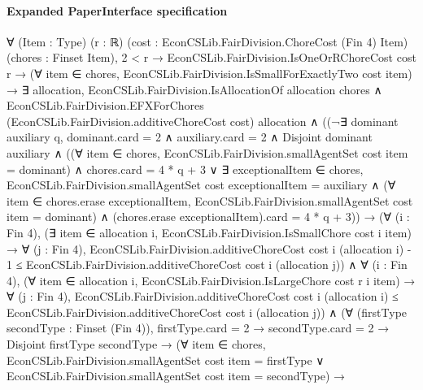 \documentclass[10pt]{article}
\begin{document}
\paragraph{Expanded PaperInterface specification}
\begin{ReviewVerbatim}
∀ (Item : Type) (r : ℝ) (cost : EconCSLib.FairDivision.ChoreCost (Fin 4) Item) (chores : Finset Item),
  2 < r →
    EconCSLib.FairDivision.IsOneOrRChoreCost cost r →
      (∀ item ∈ chores, EconCSLib.FairDivision.IsSmallForExactlyTwo cost item) →
        ∃ allocation,
          EconCSLib.FairDivision.IsAllocationOf allocation chores ∧
            EconCSLib.FairDivision.EFXForChores (EconCSLib.FairDivision.additiveChoreCost cost) allocation ∧
              ((¬∃ dominant auxiliary q,
                      dominant.card = 2 ∧
                        auxiliary.card = 2 ∧
                          Disjoint dominant auxiliary ∧
                            ((∀ item ∈ chores, EconCSLib.FairDivision.smallAgentSet cost item = dominant) ∧
                                chores.card = 4 * q + 3 ∨
                              ∃ exceptionalItem ∈ chores,
                                EconCSLib.FairDivision.smallAgentSet cost exceptionalItem = auxiliary ∧
                                  (∀ item ∈ chores.erase exceptionalItem,
                                      EconCSLib.FairDivision.smallAgentSet cost item = dominant) ∧
                                    (chores.erase exceptionalItem).card = 4 * q + 3)) →
                  (∀ (i : Fin 4),
                      (∃ item ∈ allocation i, EconCSLib.FairDivision.IsSmallChore cost i item) →
                        ∀ (j : Fin 4),
                          EconCSLib.FairDivision.additiveChoreCost cost i (allocation i) - 1 ≤
                            EconCSLib.FairDivision.additiveChoreCost cost i (allocation j)) ∧
                    ∀ (i : Fin 4),
                      (∀ item ∈ allocation i, EconCSLib.FairDivision.IsLargeChore cost r i item) →
                        ∀ (j : Fin 4),
                          EconCSLib.FairDivision.additiveChoreCost cost i (allocation i) ≤
                            EconCSLib.FairDivision.additiveChoreCost cost i (allocation j)) ∧
                (∀ (firstType secondType : Finset (Fin 4)),
                    firstType.card = 2 →
                      secondType.card = 2 →
                        Disjoint firstType secondType →
                          (∀ item ∈ chores,
                              EconCSLib.FairDivision.smallAgentSet cost item = firstType ∨
                                EconCSLib.FairDivision.smallAgentSet cost item = secondType) →

\end{ReviewVerbatim}
\end{document}
